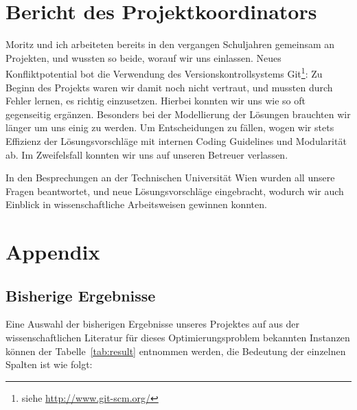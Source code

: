 \documentclass[paper=a4,fontsize=12pt]{scrartcl}
\let\origappendix\appendix
\renewcommand\appendix{\clearpage\pagenumbering{roman}\origappendix}
\begin{document}
\section{Bericht des Projektkoordinators}

Moritz und ich arbeiteten bereits in den vergangen Schuljahren gemeinsam an Projekten, und wussten so beide, worauf wir uns einlassen. Neues Konfliktpotential bot die Verwendung des Versionskontrollsystems Git\footnote{siehe \url{http://www.git-scm.org/}}: Zu Beginn des Projekts waren wir damit noch nicht vertraut, und mussten durch Fehler lernen, es richtig einzusetzen. Hierbei konnten wir uns wie so oft gegenseitig ergänzen. Besonders bei der Modellierung der Lösungen brauchten wir länger um uns einig zu werden. Um Entscheidungen zu fällen, wogen wir stets Effizienz der Lösungsvorschläge mit internen Coding Guidelines und Modularität ab. Im Zweifelsfall konnten wir uns auf unseren Betreuer verlassen. 

In den Besprechungen an der Technischen Universität Wien wurden all unsere Fragen beantwortet, und neue Lösungsvorschläge eingebracht, wodurch wir auch Einblick in wissenschaftliche Arbeitsweisen gewinnen konnten.

\newpage
\printbibliography
{}
\listoffigures
{}
\listoftables
{}
\listofalgorithms
{}


\appendix

\section{Appendix}

\subsection{Bisherige Ergebnisse}

Eine Auswahl der bisherigen Ergebnisse unseres Projektes auf aus der wissenschaftlichen Literatur für dieses Optimierungsproblem bekannten Instanzen können der Tabelle~\ref{tab:result} entnommen werden, die Bedeutung der einzelnen Spalten ist wie folgt:
\end{document}
